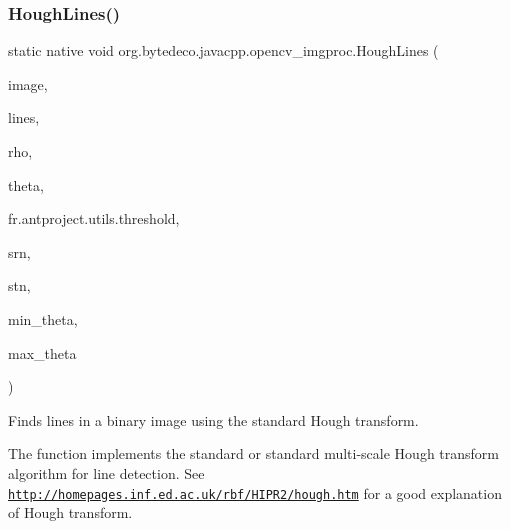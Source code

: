 \subsubsection{\texorpdfstring{Hough\+Lines()}{HoughLines()}}
{\footnotesize\ttfamily static native void org.\+bytedeco.\+javacpp.\+opencv\+\_\+imgproc.\+Hough\+Lines (\begin{DoxyParamCaption}\item[{@By\+Val Mat}]{image,  }\item[{@By\+Val Mat}]{lines,  }\item[{double}]{rho,  }\item[{double}]{theta,  }\item[{int}]{fr.antproject.utils.threshold,  }\item[{double}]{srn,  }\item[{double}]{stn,  }\item[{double}]{min\+\_\+theta,  }\item[{double}]{max\+\_\+theta }\end{DoxyParamCaption})\hspace{0.3cm}{\ttfamily [static]}}



Finds lines in a binary image using the standard Hough transform. 

The function implements the standard or standard multi-\/scale Hough transform algorithm for line detection. See \href{http://homepages.inf.ed.ac.uk/rbf/HIPR2/hough.htm}{\tt http\+://homepages.\+inf.\+ed.\+ac.\+uk/rbf/\+H\+I\+P\+R2/hough.\+htm} for a good explanation of Hough transform. 


